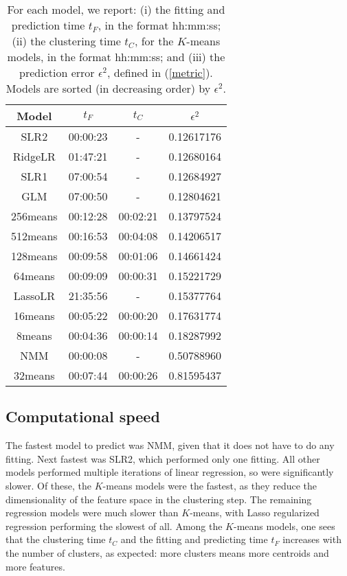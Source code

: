 \documentclass{article} %
\begin{document}
\begin{table}[htbp]
\small
   \centering
   \begin{tabular}{@{}|c|c|c|c|@{}} %
  \cline{1-4}
Model & $t_F$ & $t_C$ & $\epsilon^2$ \\ \hline
\hline
SLR2 & 00:00:23 & - & 0.12617176 \\ \hline
RidgeLR & 01:47:21 & - & 0.12680164 \\ \hline
SLR1 & 07:00:54 & - & 0.12684927 \\ \hline
GLM & 07:00:50 & - & 0.12804621 \\ \hline
256means & 00:12:28 & 00:02:21 & 0.13797524 \\ \hline
512means & 00:16:53 & 00:04:08 & 0.14206517 \\ \hline
128means & 00:09:58 & 00:01:06 & 0.14661424 \\ \hline
64means & 00:09:09 & 00:00:31 & 0.15221729 \\ \hline
LassoLR & 21:35:56 & - & 0.15377764 \\ \hline
16means & 00:05:22 & 00:00:20 & 0.17631774 \\ \hline
8means & 00:04:36 & 00:00:14 & 0.18287992 \\ \hline
NMM & 00:00:08 & - & 0.50788960 \\ \hline
32means & 00:07:44 & 00:00:26 & 0.81595437 \\ \hline
   \end{tabular}
   \caption{For each model, we report: (i) the fitting and prediction time $t_F$, in the format hh:mm:ss; (ii) the clustering time $t_C$, for the $K$-means models, in the format hh:mm:ss; and (iii) the prediction error $\epsilon^2$, defined in (\ref{metric}). Models are sorted (in decreasing order) by $\epsilon^2$.}
   \label{tab:models}
\end{table}

\subsection{Computational speed}

The fastest model to predict was NMM, given that it does not have to do any fitting. Next fastest was SLR2, which performed only one fitting. All other models performed multiple iterations of linear regression, so were significantly slower. Of these, the $K$-means models were the fastest, as they reduce the dimensionality of the feature space in the clustering step. The remaining regression models were much slower than $K$-means, with Lasso regularized regression performing the slowest of all. Among the $K$-means models, one sees that the clustering time $t_C$ and the fitting and predicting time $t_F$ increases with the number of clusters, as expected: more clusters means more centroids and more features.
\end{document}

